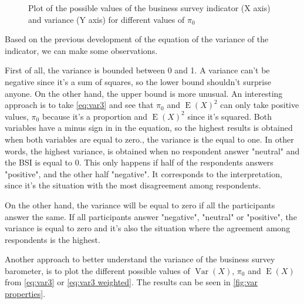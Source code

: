 \documentclass[12pt,a4paper,oneside]{book}
\DeclareMathOperator{\Var}{Var}
\DeclareMathOperator{\E}{E}
\begin{document}
\begin{figure}[hbt!]
    \caption{Plot of the possible values of the business survey indicator (X axis) and variance (Y axis) for different values of $\pi_0$ }
    \label{fig:var properties}
\end{figure}


Based on the previous development of the equation of the variance of the indicator, we can make some observations.

First of all, the variance is bounded between 0 and 1. 
A variance can't be negative since it's a sum of squares, so the lower bound shouldn't surprise anyone. On the other hand, the upper bound is more unusual. 
An interesting approach is to take  \autoref{eq:var3} and see that $\pi_0$ and $\E(X)^2$ can only take positive values, $\pi_0$ because it's a proportion and $\E(X)^2$ since it's squared. 
Both variables have a minus sign in in the equation, so the highest results is obtained when both variables are equal to zero., the variance is the equal to one.
In other words, the highest variance, is obtained when no respondent answer "neutral" and the BSI is equal to 0. 
This only happens if half of the respondents answers "positive", and the other half "negative".
It corresponds to the interpretation, since it's the situation with the most disagreement among respondents.

On the other hand, the variance will be equal to zero if all the participants answer the same. If all participants answer "negative", "neutral" or "positive", the variance is equal to zero and it's also the situation where the agreement among respondents is the highest.

Another approach to better understand the variance of the business survey barometer, is to plot the different possible values of $\Var(X)$, $\pi_0$ and $\E(X)$ from \autoref{eq:var3} or \autoref{eq:var3 weighted}. The results can be seen in \autoref{fig:var properties}.
\end{document}
